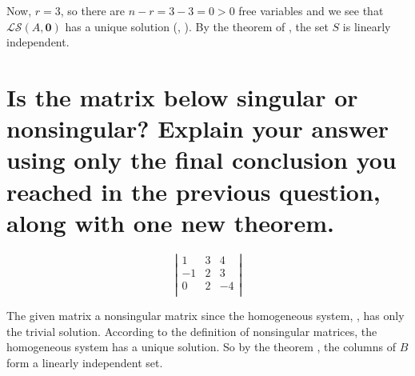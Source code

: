 \documentclass{article}
\begin{document}
Now, \(r=3\), so there are \(n-r=3-3=0 > 0\) free variables and
we see that \(\mathcal{LS}(A,\textbf{0})\) has a unique solution
(\FVCS, \HSC). By the theorem of \LIVHS, the set \(S\) is linearly independent.

\section{Is the matrix below singular or nonsingular? Explain your answer using only the final conclusion you reached in the previous question, along with one new theorem.}

\[
\left|
\begin{array}{cccc}
  1 & 3 & 4 \\
  -1 & 2 & 3 \\
  0 & 2 & -4 \\
\end{array}
\right|
\]

\sol

The given matrix a nonsingular matrix since the homogeneous system, \ls, has only the trivial solution.
According to the definition of nonsingular matrices, the homogeneous system \ls has a unique solution.
So by the theorem \LIVHS, the columns of \(B\) form a linearly independent set.
\end{document}
